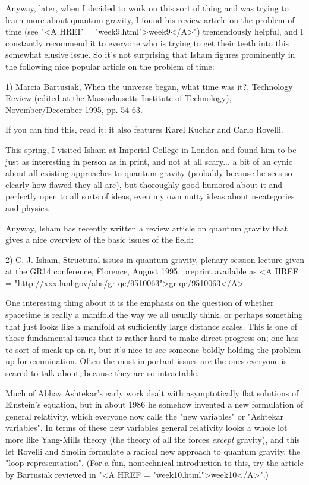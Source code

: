 Anyway, later, when I decided to work on this sort of thing and
was trying to learn more about quantum gravity, I found his review
article on the problem of time (see "<A HREF = "week9.html">week9</A>")
tremendously helpful,  
and I constantly recommend it to everyone who is trying to get their
teeth into this somewhat elusive issue.  So it's not surprising that
Isham figures prominently in the following nice popular article on the
problem of time: 

1) Marcia Bartusiak, When the universe began, what time was it?,
Technology Review (edited at the Massachusetts Institute of Technology),
November/December 1995, pp. 54-63.

If you can find this, read it: it also features Karel Kuchar and Carlo
Rovelli. 

This spring, I visited Isham at Imperial College in London and found him
to be just as interesting in person as in print, and not at all scary...
a bit of an cynic about all existing approaches to quantum gravity
(probably because he sees so clearly how flawed they all are), but
thoroughly good-humored about it and perfectly open to all sorts of
ideas, even my own nutty ideas about n-categories and physics.

Anyway, Isham has recently written a review article on quantum gravity
that gives a nice overview of the basic issues of the field:

2) C. J. Isham, Structural issues in quantum gravity, plenary session
lecture given at the GR14 conference, Florence, August 1995, preprint
available as <A HREF =
"http://xxx.lanl.gov/abs/gr-qc/9510063">gr-qc/9510063</A>. 

One interesting thing about it is the emphasis on the question of
whether spacetime is really a manifold the way we all usually think, or
perhaps something that just looks like a manifold at sufficiently large
distance scales.   This is one of those fundamental issues that is
rather hard to make direct progress on; one has to sort of sneak up on
it, but it's nice to see someone boldly holding the problem up for
examination.  Often the most important issues are the ones everyone is
scared to talk about, because they are so intractable.

Much of Abhay Ashtekar's early work dealt with asymptotically flat
solutions of Einstein's equation, but in about 1986 he somehow invented
a new formulation of general relativity, which everyone now calls the
"new variables" or "Ashtekar variables".  In terms of these new
variables general relativity looks a whole lot more like Yang-Mills
theory (the theory of all the forces \emph{except} gravity), and this let
Rovelli and Smolin formulate a radical new approach to quantum gravity,
the "loop representation".  (For a fun, nontechnical introduction to
this, try the article by Bartusiak reviewed in "<A HREF =
"week10.html">week10</A>".) 

